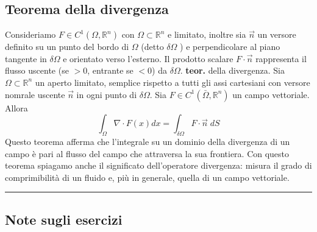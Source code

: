 \subsection*{Teorema della divergenza}
Consideriamo $F \in C^1(\Omega, \mathbb{R}^n)$ con $\Omega \subset \mathbb{R}^n$ e limitato, inoltre sia $\vec{n}$ un versore definito su un punto del bordo di $\Omega$ (detto $\delta\Omega$ ) e perpendicolare al piano tangente in $\delta \Omega$ e orientato verso l'esterno.\newline
Il prodotto scalare $F \cdot \vec{n}$ rappresenta il flusso uscente (se $> 0$, entrante se $<0$)  da $\delta\Omega$.\newline
\newline
\textbf{teor.} della divergenza.\newline
Sia $\Omega \subset \mathbb{R}^n$ un aperto limitato, semplice rispetto a tutti gli assi cartesiani con versore nomrale uscente $\vec{n}$ in ogni punto di $\delta\Omega$. Sia $F \in C^1(\bar{\Omega}, \mathbb{R}^n)$ un campo vettoriale. Allora
\[
    \int_\Omega \nabla \cdot  F(x) dx = \int_{\delta\Omega} F \cdot  \vec{n} \; dS
\]
Questo teorema afferma che l'integrale su un dominio della divergenza di un campo è pari al flusso del campo che attraversa la sua frontiera.\newline
Con questo teorema spiagamo anche il significato dell'operatore divergenza: misura il grado di comprimibilità di un fluido e, più in generale, quella di un campo vettoriale.\newline
\rule{\textwidth}{2pt}
\subsection*{Note sugli esercizi}
